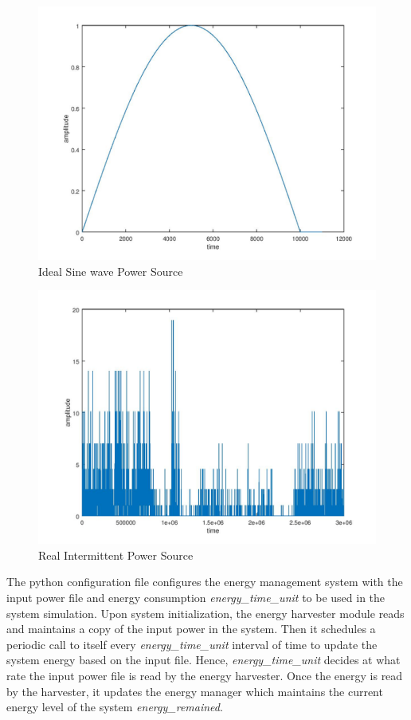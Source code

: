 \documentclass[conference]{IEEEtran}
\begin{document}
\begin{figure}[htbp]
\centerline{\includegraphics[scale=0.4]{sine_wave.jpg}}
\caption{Ideal Sine wave Power Source}
\label{fig:sine_wave}
\end{figure}

\begin{figure}[htbp]
\centerline{\includegraphics[scale=0.4]{real_wave.jpg}}
\caption{Real Intermittent Power Source}
\label{fig:real_wave}
\end{figure}

The python configuration file configures the energy management system with the input power file and energy consumption \textit{energy\_time\_unit} to be used in the system simulation. Upon system initialization, the energy harvester module reads and maintains a copy of the input power in the system. Then it schedules a periodic call to itself every \textit{energy\_time\_unit} interval of time to update the system energy based on the input file. Hence, \textit{energy\_time\_unit} decides at what rate the input power file is read by the energy harvester. Once the energy is read by the harvester, it updates the energy manager which maintains the current energy level of the system \textit{energy\_remained}.
\end{document}
